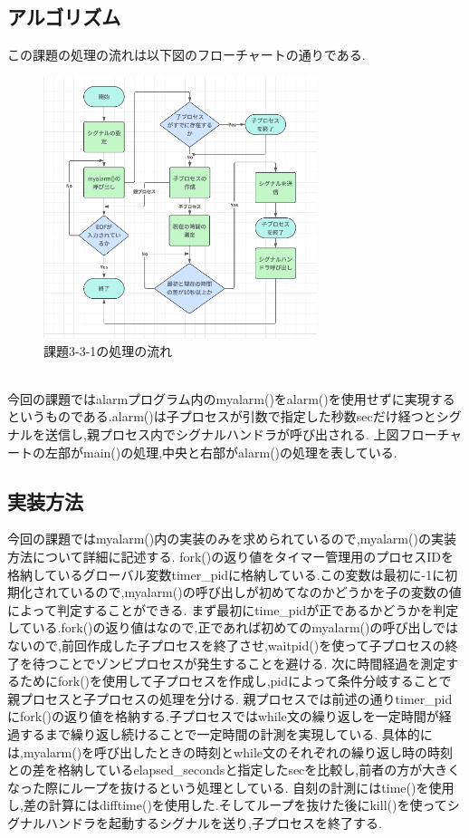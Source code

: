 \documentclass[dvipdfmx]{jarticle}
\begin{document}
\subsection{アルゴリズム}
この課題の処理の流れは以下図のフローチャートの通りである.
\begin{figure}[h]
    \centering
    \includegraphics[width=8cm]{3-3-1.png}
    \caption{課題3-3-1の処理の流れ}
\end{figure}
\\
今回の課題ではalarmプログラム内のmyalarm()をalarm()を使用せずに実現するというものである.alarm()は子プロセスが引数で指定した秒数secだけ経つとシグナルを送信し,親プロセス内でシグナルハンドラが呼び出される.
上図フローチャートの左部がmain()の処理,中央と右部がalarm()の処理を表している.
\subsection{実装方法}
今回の課題ではmyalarm()内の実装のみを求められているので,myalarm()の実装方法について詳細に記述する.
fork()の返り値をタイマー管理用のプロセスIDを格納しているグローバル変数timer\_pidに格納している.この変数は最初に-1に初期化されているので,myalarm()の呼び出しが初めてなのかどうかを子の変数の値によって判定することができる.
まず最初にtime\_pidが正であるかどうかを判定している.fork()の返り値はなので,正であれば初めてのmyalarm()の呼び出しではないので,前回作成した子プロセスを終了させ,waitpid()を使って子プロセスの終了を待つことでゾンビプロセスが発生することを避ける.
次に時間経過を測定するためにfork()を使用して子プロセスを作成し,pidによって条件分岐することで親プロセスと子プロセスの処理を分ける.
親プロセスでは前述の通りtimer\_pidにfork()の返り値を格納する.子プロセスではwhile文の繰り返しを一定時間が経過するまで繰り返し続けることで一定時間の計測を実現している.
具体的には,myalarm()を呼び出したときの時刻とwhile文のそれぞれの繰り返し時の時刻との差を格納しているelapsed\_secondsと指定したsecを比較し,前者の方が大きくなった際にループを抜けるという処理としている.
自刻の計測にはtime()を使用し,差の計算にはdifftime()を使用した.そしてループを抜けた後にkill()を使ってシグナルハンドラを起動するシグナルを送り,子プロセスを終了する.
\end{document}

